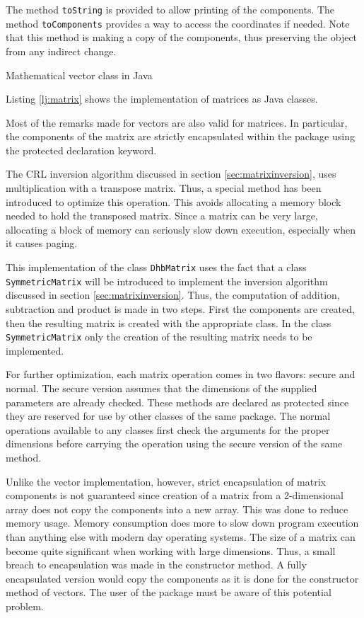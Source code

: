 \documentclass[twoside]{book}
\begin{document}
The method {\tt toString} is provided to allow printing of the
components. The method {\tt toComponents} provides a way to access
the coordinates if needed. Note that this method is making a copy
of the components, thus preserving the object from any indirect
change.

\begin{listing} Mathematical vector class in Java \label{lj:vector}

\end{listing}

Listing \ref{lj:matrix} shows the implementation of matrices as
Java classes.

Most of the remarks made for vectors are also valid for matrices.
In particular, the components of the matrix are strictly
encapsulated within the package using the protected declaration
keyword.

The CRL inversion algorithm discussed in section
\ref{sec:matrixinversion}, uses multiplication with a transpose
matrix. Thus, a special method has been introduced to optimize
this operation. This avoids allocating a memory block needed to
hold the transposed matrix. Since a matrix can be very large,
allocating a block of memory can seriously slow down execution,
especially when it causes paging.

This implementation of the class {\tt DhbMatrix} uses the fact
that a class {\tt SymmetricMatrix} will be introduced to implement
the inversion algorithm discussed in section
\ref{sec:matrixinversion}. Thus, the computation of addition,
subtraction and product is made in two steps. First the components
are created, then the resulting matrix is created with the
appropriate class. In the class {\tt SymmetricMatrix} only the
creation of the resulting matrix needs to be implemented.

For further optimization, each matrix operation comes in two
flavors: secure and normal. The secure version assumes that the
dimensions of the supplied parameters are already checked. These
methods are declared as protected since they are reserved for use
by other classes of the same package. The normal operations
available to any classes first check the arguments for the proper
dimensions before carrying the operation using the secure version
of the same method.

Unlike the vector implementation, however, strict encapsulation of
matrix components is not guaranteed since creation of a matrix
from a 2-dimensional array does not copy the components into a new
array. This was done to reduce memory usage. Memory consumption
does more to slow down program execution than anything else with
modern day operating systems. The size of a matrix can become
quite significant when working with large dimensions. Thus, a
small breach to encapsulation was made in the constructor method.
A fully encapsulated version would copy the components as it is
done for the constructor method of vectors. The user of the
package must be aware of this potential problem.
\end{document}
